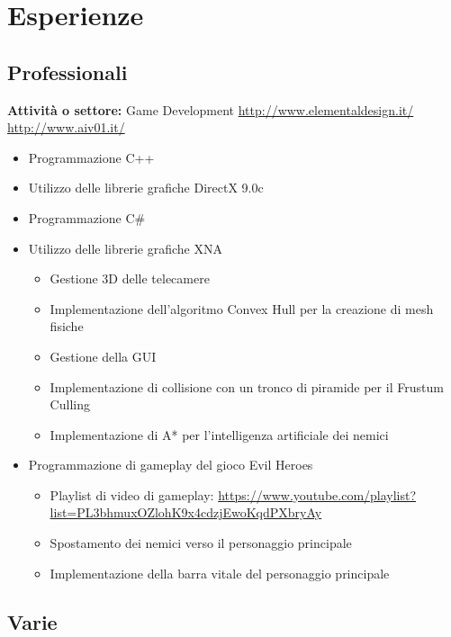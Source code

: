 \documentclass[11pt,a4paper,sans]{moderncv} %
\begin{document}
\section{Esperienze}

\subsection{Professionali}

{
	\textbf{Attivit\`{a} o settore:} Game Development
	\newline{}
	\url{http://www.elementaldesign.it/}
	\newline{}
	\url{http://www.aiv01.it/} 
	\begin{itemize}
		\item Programmazione C++
		\item Utilizzo delle librerie grafiche DirectX 9.0c
		\item Programmazione C\#
		\item Utilizzo delle librerie grafiche XNA
		\begin{itemize}
			\item Gestione 3D delle telecamere
			\item Implementazione dell'algoritmo Convex Hull per la creazione di mesh fisiche
			\item Gestione della GUI
			\item Implementazione di collisione con un tronco di piramide per il Frustum Culling
			\item Implementazione di A* per l'intelligenza artificiale dei nemici
		\end{itemize}
		\item Programmazione di gameplay del gioco Evil Heroes
		\begin{itemize}
			\item Playlist di video di gameplay:
			\newline{}
			\url{https://www.youtube.com/playlist?list=PL3bhmuxOZlohK9x4cdzjEwoKqdPXbryAy}
			\item Spostamento dei nemici verso il personaggio principale
			\item Implementazione della barra vitale del personaggio principale
		\end{itemize}
	\end{itemize}
}

\subsection{Varie}
\end{document}

